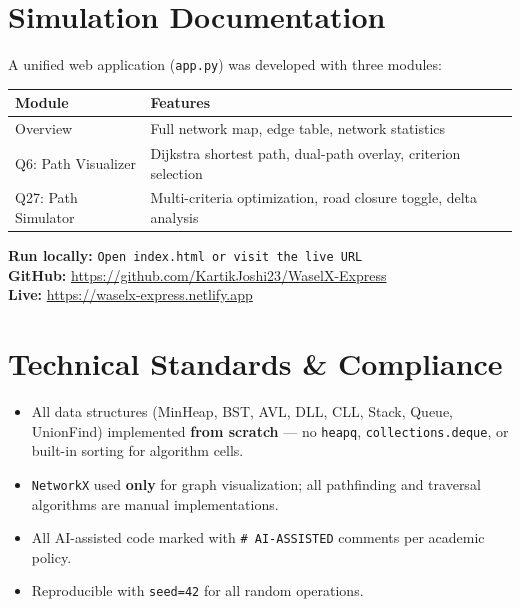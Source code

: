 \documentclass[12pt,a4paper]{article}
\begin{document}
\newpage
\section{Simulation Documentation}

A unified web application (\texttt{app.py}) was developed with three modules:

\begin{table}[H]
\centering
\begin{tabularx}{\textwidth}{lX}
\toprule
\textbf{Module} & \textbf{Features} \\
\midrule
Overview & Full network map, edge table, network statistics \\
Q6: Path Visualizer & Dijkstra shortest path, dual-path overlay, criterion selection \\
Q27: Path Simulator & Multi-criteria optimization, road closure toggle, delta analysis \\
\bottomrule
\end{tabularx}
\end{table}

\textbf{Run locally:} \texttt{Open index.html or visit the live URL}\\
\textbf{GitHub:} \url{https://github.com/KartikJoshi23/WaselX-Express}\\
\textbf{Live:} \url{https://waselx-express.netlify.app}

\section{Technical Standards \& Compliance}

\begin{itemize}[nosep,leftmargin=*]
    \item All data structures (MinHeap, BST, AVL, DLL, CLL, Stack, Queue, UnionFind) implemented \textbf{from scratch} --- no \texttt{heapq}, \texttt{collections.deque}, or built-in sorting for algorithm cells.
    \item \texttt{NetworkX} used \textbf{only} for graph visualization; all pathfinding and traversal algorithms are manual implementations.
    \item All AI-assisted code marked with \texttt{\# AI-ASSISTED} comments per academic policy.
    \item Reproducible with \texttt{seed=42} for all random operations.
\end{itemize}
\end{document}
